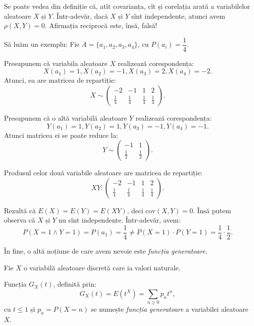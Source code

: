 Se poate vedea din definiție că, atît covarianța, cît și corelația arată  a variabilelor aleatoare $ X $ și $ Y $. Într-adevăr, dacă $ X $ și $ Y $
sînt independente, atunci avem $ \rho(X, Y) = 0 $. Afirmația reciprocă este, însă, falsă!

Să luăm un exemplu: Fie $ A = \{ a_1, a_2, a_3, a_4 \}$, cu $ P(a_i) = \dfrac{1}{4} $.

Presupunem că variabila aleatoare $ X $ realizează corespondența:
\[
  X(a_1) = 1, X(a_2) = -1, X(a_3) = 2, X(a_4) = -2.
\]
Atunci, ea are matricea de repartiție:
\[
  X \sim
  \begin{pmatrix}
    -2 & -1 & 1 & 2 \\
    \frac{1}{4} & \frac{1}{4} & \frac{1}{4} & \frac{1}{4}
  \end{pmatrix}.
\]

Presupunem că o altă variabilă aleatoare $ Y $ realizează corespondența:
\[
  Y(a_1) = 1, Y(a_2) = 1, Y(a_3) = -1, Y(a_4) = -1.
\]
Atunci matricea ei se poate reduce la:
\[
  Y \sim
  \begin{pmatrix}
    -1 & 1 \\
    \frac{1}{2} & \frac{1}{2}
  \end{pmatrix}.
\]

Produsul celor două variabile aleatoare are matricea de repartiție:
\[
  XY :
  \begin{pmatrix}
    -2 & -1 & 1 & 2 \\
    \frac{1}{4} & \frac{1}{4} & \frac{1}{4} & \frac{1}{4}
  \end{pmatrix}.
\]

Rezultă că $ E(X) = E(Y) = E(XY) $, deci $ \mathrm{cov}(X, Y) = 0 $. Însă putem
observa că $ X $ și $ Y $ nu sînt independente. Într-adevăr, avem:
\[
  P(X = 1 \land Y = 1) = P(a_1) = \frac{1}{4} \neq %
  P(X = 1) \cdot P(Y = 1) = \frac{1}{4} \cdot \frac{1}{2}.
\]

În fine, o altă noțiune de care avem nevoie este \emph{funcția generatoare}.

\begin{definition}\label{def:generatoare}
  Fie $ X $ o variabilă aleatoare discretă care ia valori naturale.

  Funcția $ G_X(t) $, definită prin:
  \[
    G_X(t) = E(t^X) = \sum_{n \geq 0} p_n t^n, 
  \]
  cu $ t \leq 1 $ și $ p_n = P(X = n) $ se numește \emph{funcția generatoare}
  a variabilei aleatoare $ X $.
\end{definition}

